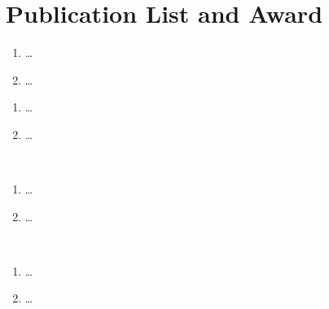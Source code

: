 \chapter{Publication List and Award}


\begin{enumerate}
\item \ldots

\item \ldots

\end{enumerate}
\vspace{2ex}



\begin{enumerate}

\item \ldots

\item \ldots

\end{enumerate}
\vspace{2ex}



  

\newpage

\\
\begin{enumerate}

\item \ldots

\item \ldots

\end{enumerate}
\vspace{2ex}



\\

\begin{enumerate}
\item \ldots

\item \ldots
\end{enumerate}